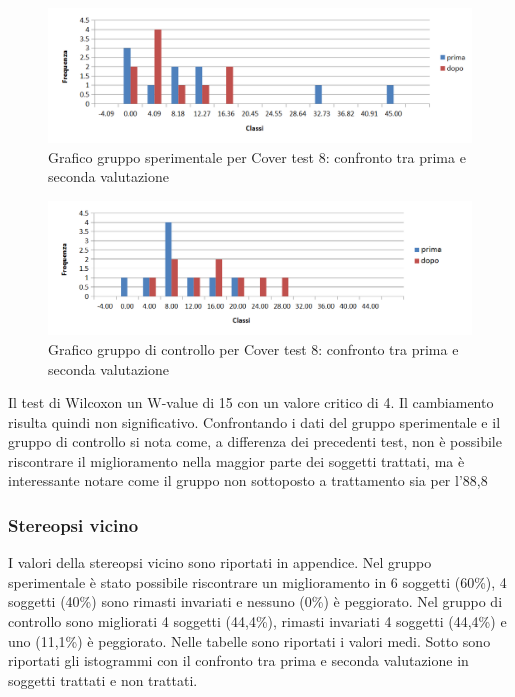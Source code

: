  \begin{figure}[h!]
	\centering
	\includegraphics[scale=0.8]{source/grafici/cover_test_8_trattati_nuovo.png}
	\caption[figure]{Grafico gruppo sperimentale per Cover test 8: confronto tra prima e seconda valutazione}
	\label{fig:issuexample}
\end{figure}
 \begin{figure}[h!]
	\centering
	\includegraphics[scale=0.8]{source/grafici/cover_test_8_giustissimo_non_trattati.png}
	\caption[figure]{Grafico gruppo di controllo per Cover test 8: confronto tra prima e seconda valutazione}
	\label{fig:issuexample}
\end{figure}

Il test di Wilcoxon un W-value di 15 con un valore critico di 4. Il cambiamento risulta quindi non significativo. Confrontando i dati del gruppo sperimentale e il gruppo di controllo si nota come, a differenza dei precedenti test, non è possibile riscontrare il miglioramento nella maggior parte dei soggetti trattati, ma è interessante notare come il gruppo non sottoposto a trattamento sia per l’88,8%


\subsubsection{Stereopsi vicino}

I valori della stereopsi vicino sono riportati in appendice. Nel gruppo sperimentale è stato possibile riscontrare un miglioramento in 6 soggetti (60\%), 4 soggetti (40\%) sono rimasti invariati e nessuno (0\%) è peggiorato. Nel gruppo di controllo sono migliorati 4 soggetti (44,4\%), rimasti invariati 4 soggetti (44,4\%) e uno (11,1\%) è peggiorato. Nelle tabelle sono riportati i valori medi. Sotto sono riportati gli istogrammi con il confronto tra prima e seconda valutazione in soggetti trattati e non trattati.

